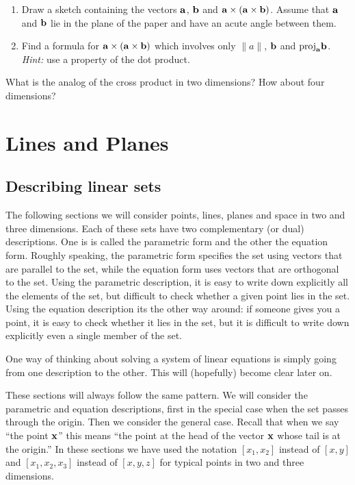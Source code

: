 \begin{problem}
\label{2008_a2_5}
{\begin{enumerate}
\renewcommand{\labelenumi}{(\alph{enumi})}
\item Draw a sketch containing the vectors $\aa$, $\bb$ and 
$\aa \times (\aa \times \bb)$. Assume that $\aa$ and $\bb$ lie in the 
plane of the paper and have an acute angle between them. 
\item Find a formula for $\aa \times (\aa \times \bb)$ which 
involves only $\| a \|$, $\bb$ and $\mbox{proj}_\aa \bb$. {\em Hint:} 
use a property of the dot product. 
\end{enumerate}}
\end{problem}

\begin{problem}
\label{op1_18}
What is the analog of the cross product in two dimensions? How about
four dimensions?
\end{problem}

\section{Lines and Planes} 

\subsection{Describing linear sets}

The following sections we will consider points, lines, planes and space
in two and three dimensions. Each of these sets have two complementary (or dual)
descriptions. One is is called the parametric form and the other the equation
form. Roughly speaking, the parametric form specifies the set using vectors
that are parallel to the set, while the equation form uses vectors that are
orthogonal to the set. Using the parametric description, it is easy to 
write down explicitly all the elements of the set, but difficult to check
whether a given point lies in the set. Using the equation description its the
other way around: if someone gives you a point, it is easy to check whether it
lies in the set, but it is difficult to write down explicitly even a single
member of the set. 

One way of thinking about solving a system of linear equations is simply going
from one description to the other. This will (hopefully) become clear later on.

These sections will always follow the same pattern. We will consider the
parametric and equation descriptions, first in the
special case when the set passes through the origin. Then we consider the
general case. 
Recall that when we say ``the point $\xx$'' this means ``the point at the head
of the vector $\xx$ whose tail is at the origin.''
In these sections we have used the notation $[x_1,x_2]$ instead of $[x,y]$ 
and $[x_1,x_2,x_3]$ instead of $[x,y,z]$ for typical points in two and three
dimensions.

